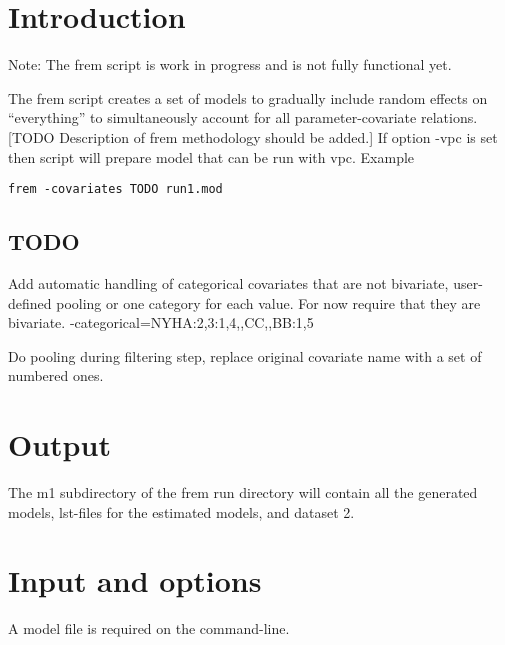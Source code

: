 



\maketitle


\section{Introduction}
Note: The frem script is work in progress and is not fully functional yet.

The frem script creates a set of models to gradually include random effects on “everything” to simultaneously account for all parameter-covariate relations. [TODO Description of frem methodology should be added.] If option -vpc is set then script will prepare model that can be run with vpc.
Example
\begin{verbatim}
frem -covariates TODO run1.mod
\end{verbatim}

\subsection{TODO}
Add automatic handling of categorical covariates that are not bivariate, user-defined pooling or one category for each value. For now require that they are bivariate.
 -categorical=NYHA:2,3:1,4,,CC,,BB:1,5

Do pooling during filtering step, replace original covariate name with a set of numbered ones. 


\section{Output}
The m1 subdirectory of the frem run directory will contain all the generated models, lst-files for the estimated models, and dataset 2.

\section{Input and options}
A model file is required on the command-line.

